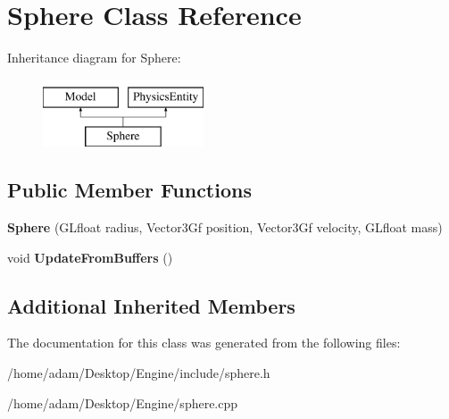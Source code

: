 \hypertarget{classSphere}{}\section{Sphere Class Reference}
\label{classSphere}
Inheritance diagram for Sphere\+:\begin{figure}[H]
\begin{center}
\leavevmode
\includegraphics[height=2.000000cm]{classSphere}
\end{center}
\end{figure}
\subsection*{Public Member Functions}
\begin{DoxyCompactItemize}
\item 
\mbox{\label{classSphere_a6d47af660fd83089c6b26519e3d1ba0b}} 
{\bfseries Sphere} (G\+Lfloat radius, Vector3\+Gf position, Vector3\+Gf velocity, G\+Lfloat mass)
\item 
\mbox{\label{classSphere_acc0ef3890c5c5aa2758c347219e55801}} 
void {\bfseries Update\+From\+Buffers} ()
\end{DoxyCompactItemize}
\subsection*{Additional Inherited Members}


The documentation for this class was generated from the following files\+:\begin{DoxyCompactItemize}
\item 
/home/adam/\+Desktop/\+Engine/include/sphere.\+h\item 
/home/adam/\+Desktop/\+Engine/sphere.\+cpp\end{DoxyCompactItemize}
